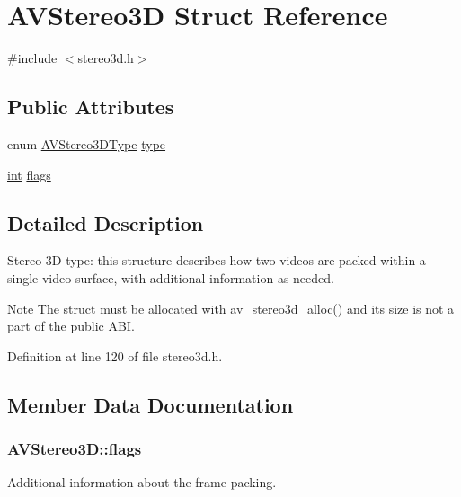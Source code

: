\hypertarget{struct_a_v_stereo3_d}{}\section{A\+V\+Stereo3D Struct Reference}
\label{struct_a_v_stereo3_d}


{\ttfamily \#include $<$stereo3d.\+h$>$}

\subsection*{Public Attributes}
\begin{DoxyCompactItemize}
\item 
enum \hyperlink{stereo3d_8h_a12fe9672eeaeb8980960faa96d2fcee6}{A\+V\+Stereo3\+D\+Type} \hyperlink{struct_a_v_stereo3_d_a052514d0376a94e58e3eb9db3db2a7ce}{type}
\item 
\hyperlink{xmltok_8h_a5a0d4a5641ce434f1d23533f2b2e6653}{int} \hyperlink{struct_a_v_stereo3_d_a9e74d14d6b5dddcd6126da075558f102}{flags}
\end{DoxyCompactItemize}


\subsection{Detailed Description}
Stereo 3D type\+: this structure describes how two videos are packed within a single video surface, with additional information as needed.

\begin{DoxyNote}{Note}
The struct must be allocated with \hyperlink{stereo3d_8h_a4c647cd938e0919c6b8cd31244343561}{av\+\_\+stereo3d\+\_\+alloc()} and its size is not a part of the public A\+BI. 
\end{DoxyNote}


Definition at line 120 of file stereo3d.\+h.



\subsection{Member Data Documentation}
\subsubsection[{\texorpdfstring{flags}{flags}}]{ A\+V\+Stereo3\+D\+::flags}\hypertarget{struct_a_v_stereo3_d_a9e74d14d6b5dddcd6126da075558f102}{}\label{struct_a_v_stereo3_d_a9e74d14d6b5dddcd6126da075558f102}
Additional information about the frame packing. 

